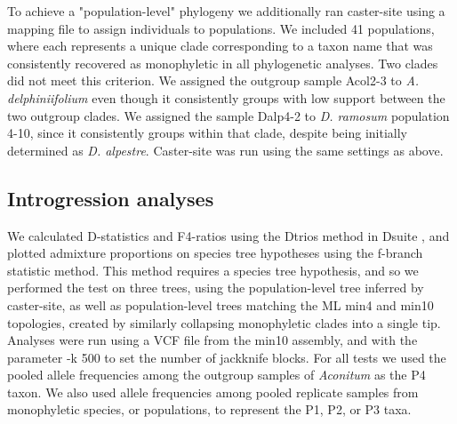 \documentclass[11pt]{article}
\begin{document}
To achieve a "population-level" phylogeny we additionally ran caster-site using 
a mapping file to assign individuals to populations. We included 41 
populations, where each represents a unique clade corresponding to a taxon name
that was consistently recovered as monophyletic in all phylogenetic analyses. 
Two clades did not meet this criterion.
We assigned the outgroup sample Acol2-3 to \emph{A. delphiniifolium} even though
it consistently groups with low support between the two outgroup clades. 
We assigned the sample Dalp4-2 to \emph{D. ramosum} population 4-10, 
since it consistently groups within that clade, despite being initially 
determined as \emph{D. alpestre}.
Caster-site was run using the same settings as above. 


\subsection{Introgression analyses}
We calculated D-statistics \citep{durand_testing_2011} and F4-ratios using the
Dtrios method in Dsuite \citep{malinsky_dsuite_2021}, and plotted admixture 
proportions on species tree hypotheses using the f-branch statistic method.
This method requires a species tree hypothesis, and so we performed the test 
on three trees, using the population-level tree inferred by caster-site, 
as well as population-level trees matching the ML min4 and min10 topologies, 
created by similarly collapsing monophyletic clades into a single tip.
Analyses were run using a VCF file from the min10 assembly, and with the 
parameter -k 500 to set the number of jackknife blocks.
% 
For all tests we used the pooled allele frequencies among the outgroup samples 
of \emph{Aconitum} as the P4 taxon. We also used allele frequencies among pooled
replicate samples from monophyletic species, or populations, to represent the
P1, P2, or P3 taxa. 
% 
\end{document}
